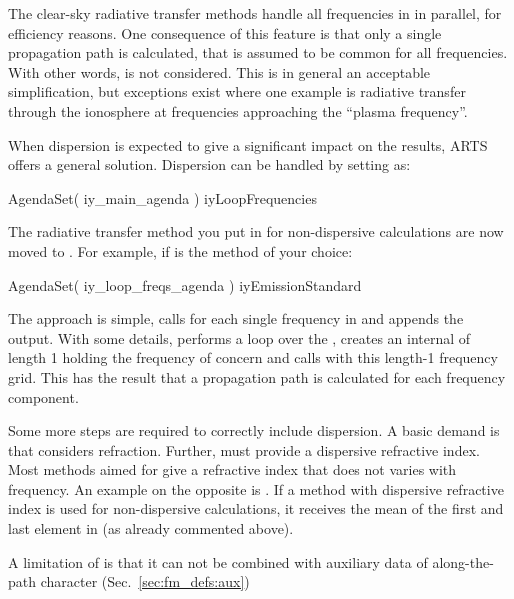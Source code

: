 The clear-sky radiative transfer methods handle all frequencies in
 in parallel, for efficiency reasons. One consequence of
this feature is that only a single propagation path is calculated, that is
assumed to be common for all frequencies. With other words,
 is not considered. This is in general an acceptable
simplification, but exceptions exist where one example is radiative
transfer through the ionosphere at frequencies approaching the ``plasma
frequency''.

When dispersion is expected to give a significant impact on the results, ARTS
offers a general solution. Dispersion can be handled by setting
 as:
\begin{code}
AgendaSet( iy_main_agenda ){
  iyLoopFrequencies
}
\end{code}
The radiative transfer method you put in  for
non-dispersive calculations are now moved to . For
example, if  is the method of your choice:
\begin{code}
AgendaSet( iy_loop_freqs_agenda ){
  iyEmissionStandard
}
\end{code}
The approach is simple,  calls
 for each single frequency in 
and appends the output. With some details, 
performs a loop over the , creates an internal
 of length 1 holding the frequency of concern and calls
 with this length-1 frequency grid. This has the
result that a propagation path is calculated for each frequency component.

Some more steps are required to correctly include dispersion. A basic demand is
that  considers refraction. Further,
 must provide a dispersive refractive
index. Most methods aimed for  give a
refractive index that does not varies with frequency. An example on the
opposite is . If a method with
dispersive refractive index is used for non-dispersive calculations, it
receives the mean of the first and last element in  (as
already commented above).

A limitation of  is that it can not be combined
with auxiliary data of along-the-path character (Sec.~\ref{sec:fm_defs:aux})







